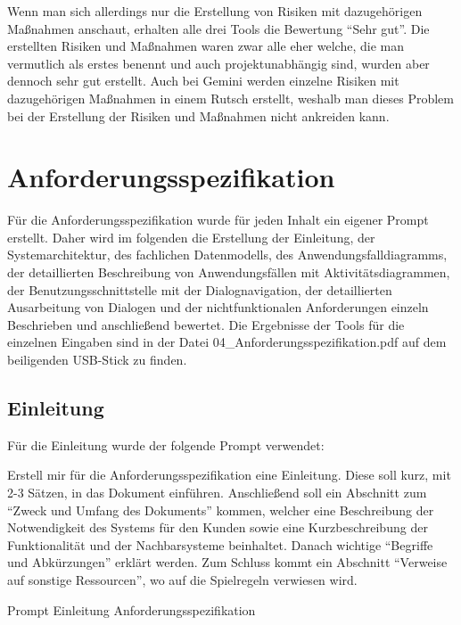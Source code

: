Wenn man sich allerdings nur die Erstellung von Risiken mit dazugehörigen Maßnahmen anschaut, erhalten alle drei 
Tools die Bewertung ``Sehr gut''. Die erstellten Risiken und Maßnahmen waren zwar alle eher welche, die man vermutlich 
als erstes benennt und auch projektunabhängig sind, wurden aber dennoch sehr gut erstellt. Auch bei Gemini werden 
einzelne Risiken mit dazugehörigen Maßnahmen in einem Rutsch erstellt, weshalb man dieses Problem bei der Erstellung 
der Risiken und Maßnahmen nicht ankreiden kann.

\section{Anforderungsspezifikation}  \label{CompAnforderungsspezifikation}

Für die Anforderungsspezifikation wurde für jeden Inhalt ein eigener Prompt erstellt. Daher wird im folgenden die Erstellung der Einleitung, 
der Systemarchitektur, des fachlichen Datenmodells, des Anwendungsfalldiagramms, der detaillierten Beschreibung von Anwendungsfällen mit Aktivitätsdiagrammen, 
der Benutzungsschnittstelle mit der Dialognavigation, der detaillierten Ausarbeitung von Dialogen und der nichtfunktionalen Anforderungen einzeln
Beschrieben und anschließend bewertet. Die Ergebnisse der Tools für die einzelnen Eingaben sind in der Datei 04\_Anforderungsspezifikation.pdf auf 
dem beiligenden USB-Stick zu finden.

\clearpage

\subsection*{Einleitung}

Für die Einleitung wurde der folgende Prompt verwendet:

\begin{prompt}[H]
    \begin{tcolorbox}[colback=gray!20, colframe=gray!20, boxrule=0pt, sharp corners] 
        Erstell mir für die Anforderungsspezifikation eine Einleitung. Diese soll kurz, mit 2-3 Sätzen, in das Dokument einführen. Anschließend soll 
        ein Abschnitt zum ``Zweck und Umfang des Dokuments'' kommen, welcher eine Beschreibung der Notwendigkeit des Systems für den Kunden sowie eine 
        Kurzbeschreibung der Funktionalität und der Nachbarsysteme beinhaltet. Danach wichtige ``Begriffe und Abkürzungen'' erklärt werden. Zum Schluss 
        kommt ein Abschnitt ``Verweise auf sonstige Ressourcen'', wo auf die Spielregeln verwiesen wird.
        \vfill
    \end{tcolorbox}
    \caption{Prompt Einleitung Anforderungsspezifikation}
    \label{Prompt Einleitung Anforderungsspezifikation}
\end{prompt}

